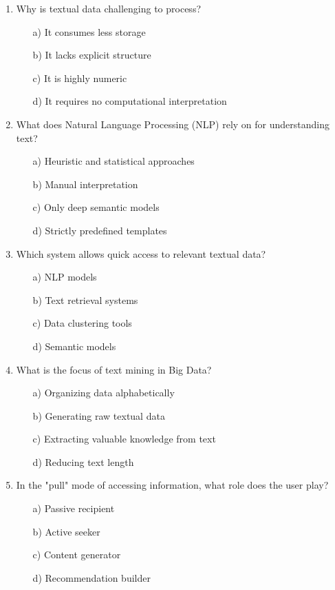 \documentclass[8pt]{extarticle}
\begin{document}
\begin{multicols}{2}
\begin{enumerate}
\item Why is textual data challenging to process?
\begin{itemize}
    \item[a)] It consumes less storage
    \item[b)] It lacks explicit structure
    \item[c)] It is highly numeric
    \item[d)] It requires no computational interpretation
\end{itemize}

\item What does Natural Language Processing (NLP) rely on for understanding text?
\begin{itemize}
    \item[a)] Heuristic and statistical approaches
    \item[b)] Manual interpretation
    \item[c)] Only deep semantic models
    \item[d)] Strictly predefined templates
\end{itemize}

\item Which system allows quick access to relevant textual data?
\begin{itemize}
    \item[a)] NLP models
    \item[b)] Text retrieval systems
    \item[c)] Data clustering tools
    \item[d)] Semantic models
\end{itemize}

\item What is the focus of text mining in Big Data?
\begin{itemize}
    \item[a)] Organizing data alphabetically
    \item[b)] Generating raw textual data
    \item[c)] Extracting valuable knowledge from text
    \item[d)] Reducing text length
\end{itemize}

\item In the "pull" mode of accessing information, what role does the user play?
\begin{itemize}
    \item[a)] Passive recipient
    \item[b)] Active seeker
    \item[c)] Content generator
    \item[d)] Recommendation builder
\end{itemize}


\end{enumerate}
\end{multicols}
\end{document}
